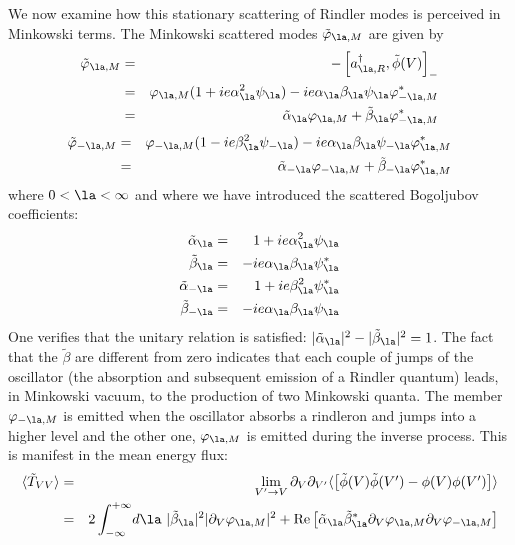 \documentclass[12pt]{article}
\begin{document}
We now examine how this stationary scattering of Rindler modes is
perceived in Minkowski terms.
 The Minkowski scattered modes $ \tilde \varphi_{\la,M}$ are given by
\begin{eqnarray}
 \tilde \varphi_{\la,M} &=&  - \left[ a_{\la,R}^\dagger,  \tilde \phi (V)
\right]_-
\nonumber\\ &=&
\varphi_{\la,M} (1+ie\alpha _{\la} ^2 \psi_{\la}) -ie\alpha _{\la}
\beta_{\la} \psi_{\la} \varphi_{- \la,M} ^*
\nonumber\\ &=&  \tilde  \alpha _{\la} \varphi_{\la,M} +  \tilde
\beta_{\la} \varphi_{- \la,M} ^*
\label{seize}
\end{eqnarray}
\begin{eqnarray}
\tilde \varphi_{- \la,M} &=& \varphi_{- \la,M} (1 -ie\beta_{\la}^2
\psi_{- \la}) -ie\alpha _{\la} \beta_{\la} \psi_{- \la} \varphi_{ \la,M}
^* \nonumber\\ &=&  \tilde  \alpha _{- \la} \varphi_{- \la,M} +  \tilde
\beta_{- \la} \varphi_{\la,M} ^*
\label{dsept}
\end{eqnarray}
where $ 0 < \la < \infty $ and where we have introduced the scattered
Bogoljubov coefficients:
\begin{eqnarray}
 \tilde  \alpha _{\la} &=&  1+ie\alpha _{\la} ^2 \psi_{\la}
\nonumber\\
 \tilde
\beta_{\la} &=& -ie\alpha _{\la}
\beta_{\la} \psi^*_{\la}
\nonumber\\
\tilde  \alpha _{- \la} &=& 1 +ie\beta_{\la}^2
\psi^*_{\la}
\nonumber\\
\tilde
\beta_{- \la} &=& -ie\alpha _{\la} \beta_{\la} \psi_{\la}
\label{dhuit}
\end{eqnarray}
One verifies that the unitary relation is satisfied:
$| \tilde \alpha_{\la}|^2-| \tilde \beta_{\la}|^2=1$.
 The fact that the $ \tilde \beta $ are different from zero indicates
that each couple of jumps of the oscillator
(the absorption and subsequent emission of a Rindler quantum)
leads, in Minkowski vacuum, to the production of two Minkowski quanta.
The member $ \varphi_{- \la , M}$ is emitted when the oscillator
absorbs a rindleron and jumps into a higher level and the other one,
$ \varphi_{ \la , M}$ is emitted during the inverse process.
This is
manifest
in the mean energy flux:
\begin{eqnarray}
\bk{\tilde T_{VV}} &=&  \lim_{V^\prime
\rightarrow V}\partial_V \partial_{V^\prime} \bk{\left[ \tilde \phi(V)
\tilde \phi(V^\prime) -
\phi(V) \phi(V^\prime) \right]}
\nonumber\\ &=& 2  \int_{-\infty}^{+\infty} \! d\la\  | \tilde \beta_{\la}|^2
| \partial_V \varphi_{\la,M}|^2 +
\mbox{Re} \left[ \tilde  \alpha
_{\la} \tilde \beta_{\la}^*
\partial_V \varphi_{\la,M} \partial_V \varphi_{- \la,M} \right]
\label{dneuf}
\end{eqnarray}
\end{document}
